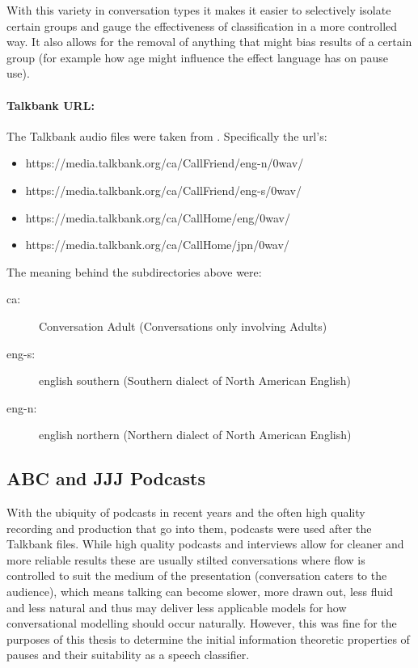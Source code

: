 With this variety in conversation types it makes it easier to selectively isolate certain groups and gauge the effectiveness of classification in a more controlled way. It also allows for the removal of anything that might bias results of a certain group (for example how age might influence the effect language has on pause use). 

\paragraph{Talkbank URL:} The Talkbank audio files were taken from . Specifically the url's: 

\begin{itemize} \\
	\item https://media.talkbank.org/ca/CallFriend/eng-n/0wav/ 
	\item https://media.talkbank.org/ca/CallFriend/eng-s/0wav/ 
	\item https://media.talkbank.org/ca/CallHome/eng/0wav/ 
	\item https://media.talkbank.org/ca/CallHome/jpn/0wav/ 
\end{itemize}

The meaning behind the subdirectories above were:
\begin{description} 
\item[ca:] Conversation Adult (Conversations only involving Adults)
\item[eng-s:] english southern (Southern dialect of North American English)
\item[eng-n:] english northern (Northern dialect of North American English)
\end{description}


\subsection{ABC and JJJ Podcasts}
With the ubiquity of podcasts in recent years and the often high quality recording and production that go into them, podcasts were used after the Talkbank files. While high quality podcasts and interviews allow for cleaner and more reliable results these are usually stilted conversations where flow is controlled to suit the medium of the presentation (conversation caters to the audience), which means talking can become slower, more drawn out, less fluid and less natural and thus may deliver less applicable models for how conversational modelling should occur naturally. However, this was fine for the purposes of this thesis to determine the initial information theoretic properties of pauses and their suitability as a speech classifier.  


